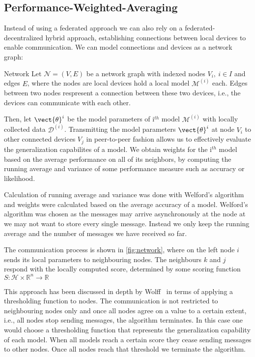 \subsection{Performance-Weighted-Averaging}

Instead of using a federated approach we can also rely on a federated-decentralized hybrid approach, establishing connections between local devices to enable communication.
We can model connections and devices as a network graph:
\begin{definition}{Network}
    Let $\mathcal{N} = (V, E)$ be a network graph with indexed nodes $V_i, \: i \in I$ and edges $E$, where the nodes are local devices hold a local model $\mathcal{M}^{(i)}$ each.
    Edges between two nodes respresent a connection between these two devices, i.e., the devices can communicate with each other.
\end{definition}

Then, let $\vect{\theta}^{i}$ be the model parameters of i$^{th}$ model $\mathcal{M}^{(i)}$ with locally collected data $\mathcal{D}^{(i)}$.
Transmitting the model parameters $\vect{\theta}^{i}$  at node $V_i$  to other connected devices  $V_j$ in peer-to-peer fashion allows us to effectively evaluate the generalization capabilites of a model.
We obtain weights for the i$^{th}$ model based on the average performance on all of its neighbors, by computing the running average and variance of some performance measure such as accuracy or likelihood.

Calculation of running average and variance was done with Welford's algorithm and weights were calculated based on the average accuracy of a model.
Welford's algorithm was chosen as the messages may arrive asynchronously at the node at we may not want to store every single message.
Instead we only keep the running average and the number of messages we have received so far.

The communication process is shown in \fig \ref{fig:network}, where on the left node $i$ sends its local parameters to neighbouring nodes. The neighbours $k$ and $j$ respond with the locally computed score, determined by some scoring function $S: \mathcal{H} \times \mathbb{R}^n \rightarrow \mathbb{R}$


This approach has been discussed in depth by Wolff~\cite{wolff2013local} in terms of applying a thresholding function to nodes.
The communication is not restricted to neighbouring nodes only and once all nodes agree on a value to a certain extent, i.e., all nodes stop sending messages, the algorithm terminates.
In this case one would choose a thresholding function that represents the generalization capability of each model.
When all models reach a certain score they cease sending messages to other nodes. 
Once all nodes reach that threshold we terminate the algorithm.

